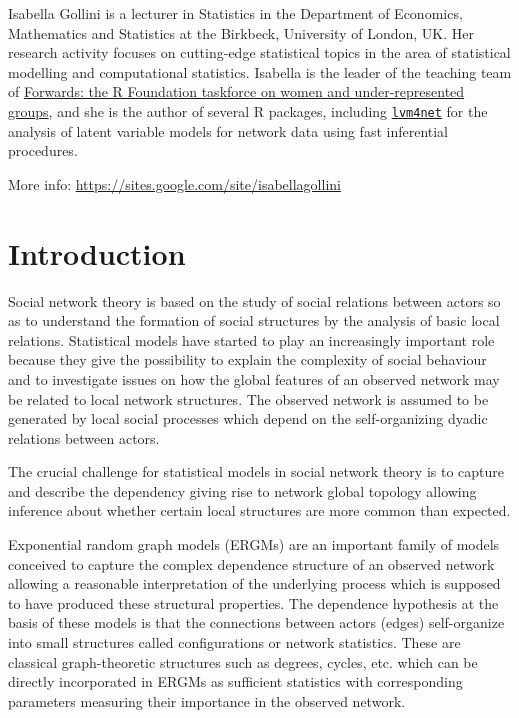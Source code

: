 \documentclass[]{book}
\begin{document}
Isabella Gollini is a lecturer in Statistics in the Department of
Economics, Mathematics and Statistics at the Birkbeck, University of
London, UK. Her research activity focuses on cutting-edge statistical
topics in the area of statistical modelling and computational
statistics. Isabella is the leader of the teaching team of
\href{http://forwards.github.io/}{Forwards: the R Foundation taskforce
on women and under-represented groups}, and she is the author of several
R packages, including
\href{https://CRAN.R-project.org/package=lvm4net}{\texttt{lvm4net}} for
the analysis of latent variable models for network data using fast
inferential procedures.

More info:
\href{https://sites.google.com/site/isabellagollini/}{https://sites.google.com/site/isabellagollini}

\chapter{Introduction}\label{intro}

Social network theory is based on the study of social relations between
actors so as to understand the formation of social structures by the
analysis of basic local relations. Statistical models have started to
play an increasingly important role because they give the possibility to
explain the complexity of social behaviour and to investigate issues on
how the global features of an observed network may be related to local
network structures. The observed network is assumed to be generated by
local social processes which depend on the self-organizing dyadic
relations between actors.

The crucial challenge for statistical models in social network theory is
to capture and describe the dependency giving rise to network global
topology allowing inference about whether certain local structures are
more common than expected.

Exponential random graph models (ERGMs) \citep{hol:lei81} are an
important family of models conceived to capture the complex dependence
structure of an observed network allowing a reasonable interpretation of
the underlying process which is supposed to have produced these
structural properties. The dependence hypothesis at the basis of these
models is that the connections between actors (edges) self-organize into
small structures called configurations or network statistics. These are
classical graph-theoretic structures such as degrees, cycles, etc. which
can be directly incorporated in ERGMs as sufficient statistics with
corresponding parameters measuring their importance in the observed
network.
\end{document}
